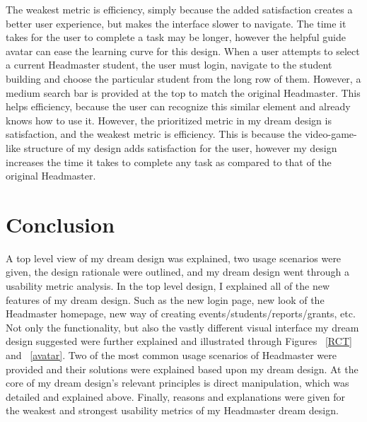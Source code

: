 \documentclass[11pt]{article}
\begin{document}
The weakest metric is efficiency, simply because the added satisfaction creates a better user experience, but makes the interface slower to navigate. The time it takes for the user to complete a task may be longer, however the helpful guide avatar can ease the learning curve for this design. When a user attempts to select a current Headmaster student, the user must login, navigate to the student building and choose the particular student from the long row of them. However, a medium search bar is provided at the top to match the original Headmaster. This helps efficiency, because the user can recognize this similar element and already knows how to use it. However, the prioritized metric in my dream design is satisfaction, and the weakest metric is efficiency. This is because the video-game-like structure of my design adds satisfaction for the user, however my design increases the time it takes to complete any task as compared to that of the original Headmaster.

\section{Conclusion}
A top level view of my dream design was explained, two usage scenarios were given, the design rationale were outlined, and my dream design went through a usability metric analysis. In the top level design, I explained all of the new features of my dream design. Such as the new login page, new look of the Headmaster homepage, new way of creating events/students/reports/grants, etc. Not only the functionality, but also the vastly different visual interface my dream design suggested were further explained and illustrated through Figures ~\ref{RCT} and ~\ref{avatar}. Two of the most common usage scenarios of Headmaster were provided and their solutions were explained based upon my dream design. At the core of my dream design's relevant principles is direct manipulation, which was detailed and explained above. Finally, reasons and explanations were given for the weakest and strongest usability metrics of my Headmaster dream design. 



\end{document}
